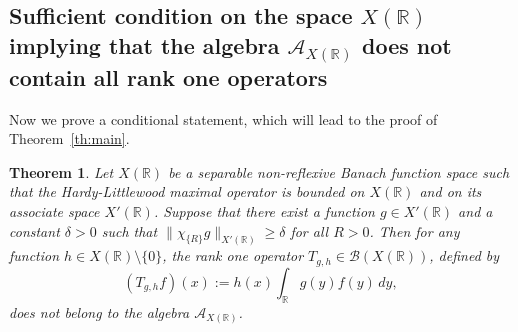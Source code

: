 \documentclass[reqno]{amsproc}
\newcommand{\cA}{\mathcal{A}}
\newcommand{\R}{\mathbb{R}}
\newtheorem{theorem}{Theorem}[section]
\theoremstyle{definition}
\theoremstyle{remark}
\numberwithin{equation}{section}
\begin{document}
\subsection{Sufficient condition on the space $X(\R)$ implying that the 
algebra $\cA_{X(\R)}$ does not contain all rank one operators}
Now we prove a conditional statement, which will lead 
to the proof of Theorem~\ref{th:main}.
\begin{theorem}\label{th:main-key-step}
Let $X(\mathbb{R})$ be a separable non-reflexive Banach function space such 
that the Hardy-Littlewood maximal operator is bounded on $X(\R)$ 
and on its associate space $X'(\mathbb{R})$. Suppose that there exist a 
function $g \in X'(\mathbb{R})$ and a constant $\delta > 0$ such that 
$\|\chi_{\{R\}}g\|_{X'(\mathbb{R})} \ge \delta$ for all $R > 0$. Then for 
any function $h \in X(\mathbb{R})\setminus\{0\}$, the rank one operator 
$T_{g,h} \in \mathcal{B}(X(\mathbb{R}))$, defined by
\[
(T_{g,h}f)(x) := h(x) \int_\R g(y) f(y)\, dy ,
\]
does not belong to the algebra $\mathcal{A}_{X(\mathbb{R})}$.
\end{theorem}
\end{document}
